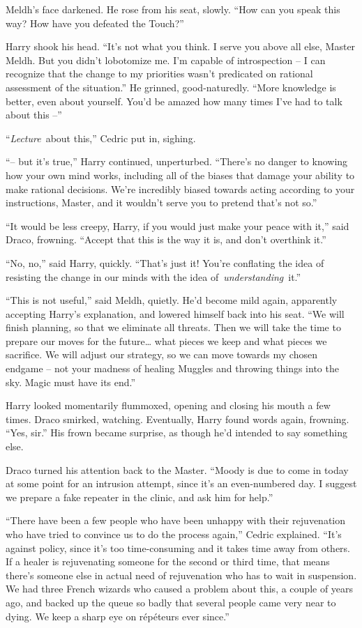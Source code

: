 Meldh's face darkened. He rose from his seat, slowly. ``How can you
speak this way? How have you defeated the Touch?''

Harry shook his head. ``It's not what you think. I serve you above all
else, Master Meldh. But you didn't lobotomize me. I'm capable of
introspection -- I can recognize that the change to my priorities wasn't
predicated on rational assessment of the situation.'' He grinned,
good-naturedly. ``More knowledge is better, even about yourself. You'd
be amazed how many times I've had to talk about this --''

``\emph{Lecture}~about this,'' Cedric put in, sighing.

``-- but it's true,'' Harry continued, unperturbed. ``There's no danger
to knowing how your own mind works, including all of the biases that
damage your ability to make rational decisions. We're incredibly biased
towards acting according to your instructions, Master, and it wouldn't
serve you to pretend that's not so.''

``It would be less creepy, Harry, if you would just make your peace with
it,'' said Draco, frowning. ``Accept that this is the way it is, and
don't overthink it.''

``No, no,'' said Harry, quickly. ``That's just it! You're conflating the
idea of resisting the change in our minds with the idea
of~\emph{understanding}~it.''

``This is not useful,'' said Meldh, quietly. He'd become mild again,
apparently accepting Harry's explanation, and lowered himself back into
his seat. ``We will finish planning, so that we eliminate all threats.
Then we will take the time to prepare our moves for the future\ldots{}
what pieces we keep and what pieces we sacrifice. We will adjust our
strategy, so we can move towards my chosen endgame -- not your madness
of healing Muggles and throwing things into the sky. Magic must have its
end.''

Harry looked momentarily flummoxed, opening and closing his mouth a few
times. Draco smirked, watching. Eventually, Harry found words again,
frowning. ``Yes, sir.'' His frown became surprise, as though he'd
intended to say something else.

Draco turned his attention back to the Master. ``Moody is due to come in
today at some point for an intrusion attempt, since it's an
even-numbered day. I suggest we prepare a fake repeater in the clinic,
and ask him for help.''

``There have been a few people who have been unhappy with their
rejuvenation who have tried to convince us to do the process again,''
Cedric explained. ``It's against policy, since it's too time-consuming
and it takes time away from others. If a healer is rejuvenating someone
for the second or third time, that means there's someone else in actual
need of rejuvenation who has to wait in suspension. We had three French
wizards who caused a problem about this, a couple of years ago, and
backed up the queue so badly that several people came very near to
dying. We keep a sharp eye on répéteurs ever since.''

